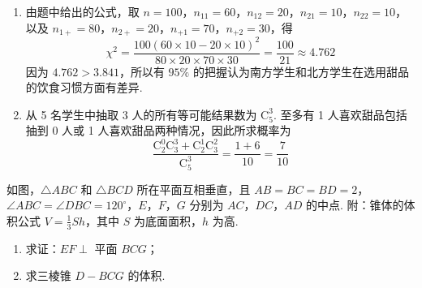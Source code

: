 \begin{solution}
\begin{enumerate}
\item 由题中给出的公式，取 \(n=100\)，\(n_{11}=60\)，\(n_{12}=20\)，\(n_{21}=10\)，\(n_{22}=10\)，以及 \(n_{1+}=80\)，\(n_{2+}=20\)，\(n_{+1}=70\)，\(n_{+2}=30\)，得
\[
\chi^{2}=\frac{100(60\times10-20\times10)^{2}}{80\times20\times70\times30}=\frac{100}{21}\approx4.762
\]
因为 \(4.762>3.841\)，所以有 \(95\%\) 的把握认为南方学生和北方学生在选用甜品的饮食习惯方面有差异.
\item 从 5 名学生中抽取 3 人的所有等可能结果数为 \(\mathrm C_{5}^{3}\). 至多有 1 人喜欢甜品包括抽到 0 人或 1 人喜欢甜品两种情况，因此所求概率为
\[
\frac{\mathrm C_{2}^{0}\mathrm C_{3}^{3}+\mathrm C_{2}^{1}\mathrm C_{3}^{2}}{\mathrm C_{5}^{3}}=\frac{1+6}{10}=\frac{7}{10}
\]
\end{enumerate}
\end{solution}

\begin{problem}
如图，\(\triangle ABC\) 和 \(\triangle BCD\) 所在平面互相垂直，且 \(AB = BC = BD = 2\)，\(\angle ABC = \angle DBC = 120^{\circ}\)，\(E\)，\(F\)，\(G\) 分别为 \(AC\)，\(DC\)，\(AD\) 的中点. 附：锥体的体积公式 \( V = \frac{1}{3} Sh \)，其中 \(S\) 为底面面积，\(h\) 为高.
\begin{enumerate}
\item 求证：\(EF \perp\) 平面 \(BCG\)；
\item 求三棱锥 \(D - BCG\) 的体积.
\end{enumerate}

\end{problem}

